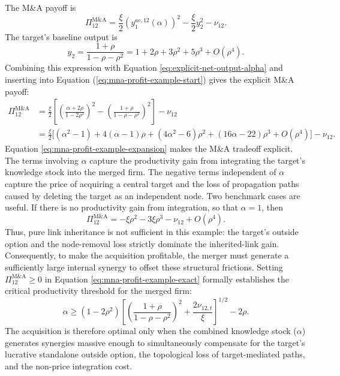 The M\&A payoff is
\begin{equation}
\Pi_{12}^{\text{M\&A}}
=
\frac{\xi}{2}
\left(y_{1}^{ac,12}(\alpha)\right)^2
-
\frac{\xi}{2}y_{2}^2
-
\nu_{12}.
\label{eq:mna-profit-example-start}
\end{equation}
The target's baseline output is
\[
y_{2}
=
\frac{1+\rho}{1-\rho-\rho^2}
=
1+2\rho+3\rho^2+5\rho^3+O(\rho^4).
\]
Combining this expression with Equation \eqref{eq:explicit-net-output-alpha} and inserting into Equation (\ref{eq:mna-profit-example-start}) gives
the explicit M\&A payoff:
\begin{align}
\Pi_{12}^{\text{M\&A}}
& =
\frac{\xi}{2}
\left[
\left(
\frac{\alpha+2\rho}{1-2\rho^2}
\right)^2
-
\left(
\frac{1+\rho}{1-\rho-\rho^2}
\right)^2
\right]
-
\nu_{12}
\label{eq:mna-profit-example-exact} \\
& =\frac{\xi}{2}
\Big[
(\alpha^2-1)
+
4(\alpha-1)\rho
+
(4\alpha^2-6)\rho^2
+
(16\alpha-22)\rho^3
+
O(\rho^4)
\Big]
-
\nu_{12}.
\label{eq:mna-profit-example-expansion}
\end{align}
Equation \eqref{eq:mna-profit-example-expansion} makes the M\&A tradeoff explicit.
The terms involving $\alpha$ capture the productivity gain from integrating the
target's knowledge stock into the merged firm. The negative terms independent of
$\alpha$ capture the price of acquiring a central target and the loss of propagation
paths caused by deleting the target as an independent node. Two benchmark cases are useful. If there is no productivity gain from integration,
so that $\alpha=1$, then
\begin{equation}
\Pi_{12}^{\text{M\&A}}
=
-\xi\rho^2
-
3\xi\rho^3
-
\nu_{12}
+
O(\rho^4).
\label{eq:mna-profit-no-synergy}
\end{equation}
Thus, pure link inheritance is not sufficient in this example: the target's outside
option and the node-removal loss strictly dominate the inherited-link gain. Consequently, to make the acquisition profitable, the merger must generate a sufficiently large internal synergy to offset these structural frictions. Setting $\Pi_{12}^{\text{M\&A}} \ge 0$ in Equation \eqref{eq:mna-profit-example-exact} formally establishes the critical productivity threshold for the merged firm:
\begin{equation}
\alpha
\ge
(1-2\rho^2)
\left[
\left(
\frac{1+\rho}{1-\rho-\rho^2}
\right)^2
+
\frac{2\nu_{12,t}}{\xi}
\right]^{1/2}
-
2\rho.
\label{eq:alpha-threshold-example}
\end{equation}
The acquisition is therefore optimal only when the combined knowledge stock ($\alpha$) generates synergies massive enough to simultaneously compensate for the target's lucrative standalone outside option, the topological loss of target-mediated paths, and the non-price integration cost. 

